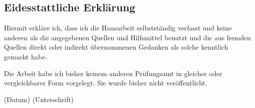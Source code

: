 \thispagestyle{empty}
\subsection*{Eidesstattliche Erklärung}
Hiermit erkläre ich, dass ich die Hausarbeit selbstständig
verfasst und keine anderen als die angegebenen Quellen und Hilfsmittel benutzt
und die aus fremden Quellen direkt oder indirekt übernommenen Gedanken als
solche kenntlich gemacht habe.

Die Arbeit habe ich bisher keinem anderen Prüfungsamt in gleicher oder
vergleichbarer Form vorgelegt. Sie wurde bisher nicht veröffentlicht.


\vspace{3cm}
\begin{center}
(Datum) \hspace{8cm} (Unterschrift)
\end{center}
